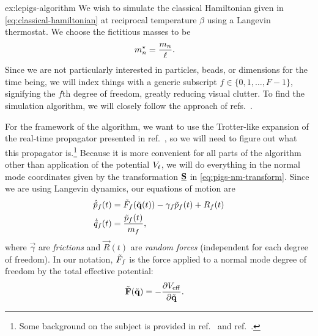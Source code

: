 \begin{DefAnswer}{ex:lepigs-algorithm}
	We wish to simulate the classical Hamiltonian given in \vref{eq:classical-hamiltonian} at reciprocal temperature $\beta$ using a Langevin thermostat.
	We choose the fictitious masses to be
	\begin{align}
		{m}^\star_n
		&= \frac{m_n}{\ell}.
	\end{align}
	Since we are not particularly interested in particles, beads, or dimensions for the time being, we will index things with a generic subscript $f \in \{ 0, 1, \ldots, F - 1 \}$, signifying the $f$th degree of freedom, greatly reducing visual clutter.
	To find the simulation algorithm, we will closely follow the approach of refs.~\cite{bussi2007accurate,ceriotti2010efficient}.

	For the framework of the algorithm, we want to use the Trotter-like expansion of the real-time propagator presented in ref.~\cite{tuckerman1992reversible}, so we will need to figure out what this propagator is.\footnote{
		Some background on the subject is provided in ref.~\cite[44-50]{evans2008statistical} and ref.~\cite[31-35]{zwanzig2001nonequilibrium}.
	}
	Because it is more convenient for all parts of the algorithm other than application of the potential $V_\ell$, we will do everything in the normal mode coordinates given by the transformation $\underline{\bm{\mathbf{S}}}$ in \vref{eq:pigs-nm-transform}.
	Since we are using Langevin dynamics, our equations of motion are~\cite{kubo1966fluctuation}
	\begin{subequations} \label{eq:langevin-eom}
	\begin{align}
		\dot{\tilde{p}}_f(t)
		&= \tilde{F}_f(\tilde{\bm{\mathbf{q}}}(t)) - \gamma_f \tilde{p}_f(t) + R_f(t)
			\label{eq:langevin-eom-p} \\
		\dot{\tilde{q}}_f(t)
		&= \frac{\tilde{p}_f(t)}{m_f},
	\end{align}
	\end{subequations}
	where $\vec{\gamma}$ are \emph{frictions} and $\vec{R}(t)$ are \emph{random forces} (independent for each degree of freedom).
	In our notation, $\tilde{F}_f$ is the force applied to a normal mode degree of freedom by the total effective potential:
	\begin{align}
		\tilde{\bm{\mathbf{F}}}(\tilde{\bm{\mathbf{q}}})
		&= -\frac{\partial V_\mathrm{eff}}{\partial \tilde{\bm{\mathbf{q}}}}.
	\end{align}


\end{DefAnswer}
